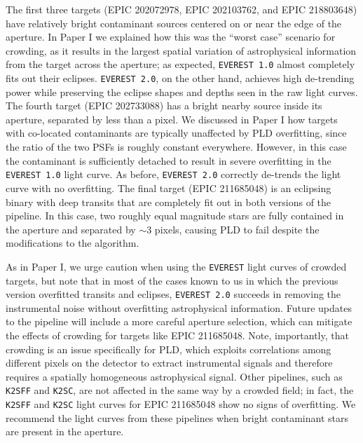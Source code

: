\documentclass[]{emulateapj}
\newcommand{\edited}[1]{{\color{red} #1}}
\begin{document}
The first three targets (EPIC 202072978, EPIC 202103762, and EPIC 218803648) have relatively bright
contaminant sources centered on or near the edge of the aperture. In Paper I we explained how this
was the ``worst case'' scenario for crowding, as it results in the largest spatial variation of
astrophysical information from the target across the aperture; as expected, \texttt{EVEREST 1.0}
almost completely fits out their eclipses. \texttt{EVEREST 2.0}, on the other hand, achieves high
de-trending power while preserving the eclipse shapes and depths seen in the raw light curves.
The fourth target (EPIC 202733088) has a bright nearby source inside its aperture, separated by
less than a pixel. We discussed in Paper I how targets with co-located contaminants are typically
unaffected by PLD overfitting, since the ratio of the two PSFs is roughly constant everywhere.
However, in this case the contaminant is sufficiently detached to result in severe overfitting
in the \texttt{EVEREST 1.0} light curve. As before, \texttt{EVEREST 2.0} correctly de-trends the light curve with
no overfitting. The final target (EPIC 211685048) is an eclipsing binary with deep transits that are completely
fit out in both versions of the pipeline. In this case, two roughly equal magnitude stars are
fully contained in the aperture and separated by ${\sim}3$ pixels, causing PLD to fail despite
the modifications to the algorithm.

As in Paper I, we urge caution when using the \texttt{EVEREST} light curves of crowded targets,
but note that in most of the cases known to us in which the previous version overfitted transits
and eclipses, \texttt{EVEREST 2.0} succeeds in removing the instrumental noise without overfitting
astrophysical information. Future updates to the pipeline will include a more careful aperture
selection, which can mitigate the effects of crowding for targets like EPIC 211685048. \edited{Note,
importantly, that crowding is an issue specifically for PLD, which exploits correlations among
different pixels on the detector to extract instrumental signals and therefore requires a spatially
homogeneous astrophysical signal. Other pipelines, such as \texttt{K2SFF} and \texttt{K2SC}, are not
affected in the same way by a crowded field; in fact, the \texttt{K2SFF} and \texttt{K2SC} light curves for EPIC 211685048
show no signs of overfitting. We recommend the light curves from these pipelines when
bright contaminant stars are present in the aperture.}
\end{document}
